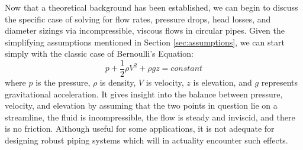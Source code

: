 \documentclass[11pt]{article} %
\numberwithin{equation}{section} %
\begin{document}
Now that a theoretical background has been established, we can begin to discuss the specific case of solving for flow rates, pressure drops, head losses, and diameter sizings via incompressible, viscous flows in circular pipes. Given the simplifying assumptions mentioned in Section \ref{sec:assumptions}, we can start simply with the classic case of Bernoulli's Equation:
\begin{equation} \label{eq:bernoulli}
p + \frac{1}{2} \rho V^{2} + \rho g z = constant
\end{equation}
where $p$ is the pressure, $\rho$ is density, $V$ is velocity, $z$ is elevation, and $g$ represents gravitational acceleration. It gives insight into the balance between pressure, velocity, and elevation by assuming that the two points in question lie on a streamline, the fluid is incompressible, the flow is steady and inviscid, and there is no friction. Although useful for some applications, it is not adequate for designing robust piping systems which will in actuality encounter such effects.
\end{document}
